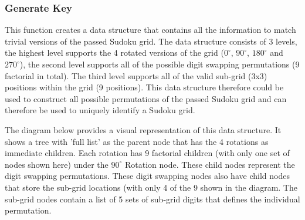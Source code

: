 \documentclass[fleqn]{article}
\begin{document}
\subsubsection{Generate Key}
 
This function creates a data structure that contains all the information to match trivial versions of the passed Sudoku grid. The data structure consists of 3 levels, the highest level supports the 4 rotated versions of the grid ($0^\circ$, $90^\circ$, $180^\circ$ and $270^\circ$), the second level supports all of the possible digit swapping permutations (9 factorial in total). The third level supports all of the valid sub-grid (3x3) positions within the grid (9 positions). This data structure therefore could be used to construct all possible permutations of the passed Sudoku grid and can therefore be used to uniquely identify a Sudoku grid.

The diagram below provides a visual representation of this data structure. It shows a tree with 'full list' as the parent node that has the 4 rotations as immediate children. Each rotation has 9 factorial children (with only one set of nodes shown here) under the $90^\circ$ Rotation node. These child nodes represent the digit swapping permutations. These digit swapping nodes also have child nodes that store the sub-grid locations (with only 4 of the 9 shown in the diagram. The sub-grid nodes contain a list of 5 sets of sub-grid digits that defines the individual permutation.
\usetikzlibrary{graphs, shapes}
\end{document}
